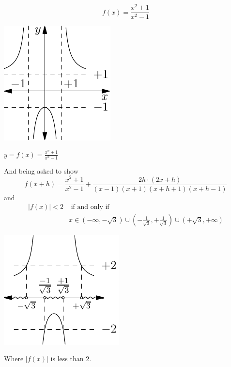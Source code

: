 \documentclass{tufte-book} %
\begin{document}
\begin{equation*}
f(x)=\frac{x^2+1}{x^2-1}
\end{equation*}
\begin{marginfigure}
\includegraphics[width=0.75\linewidth]{graphics/algebra1.pdf}
\caption{$y=f(x)=\frac{x^2+1}{x^2-1}$}
\label{fig:algebra1}
\end{marginfigure}


And being asked to show
\begin{equation*}
    f(x+h)=\frac{x^2+1}{x^2-1}+ \frac{2h\cdot(2x+h)}{(x-1)(x+1)(x+h+1)(x+h-1)}
\end{equation*}
and
\begin{align*}
  |f(x)|<2 & \text{ if and only if } \\
           &  x \in (-\infty,-\sqrt{3})\cup(-\frac{1}{\sqrt{3}},+\frac{1}{\sqrt{3}})\cup(+\sqrt{3},+\infty)
\end{align*}
\begin{marginfigure}
\includegraphics[width=0.75\linewidth]{graphics/algebra2.pdf}
\caption{Where $|f(x)|$ is less than $2$.}
\label{fig:algebra2}
\end{marginfigure}
\end{document}
